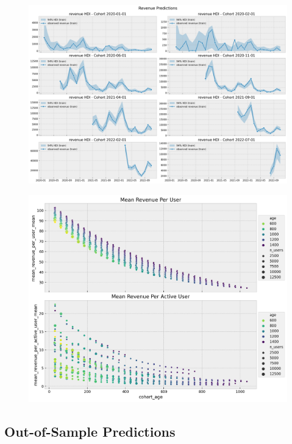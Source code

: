 \documentclass[11pt]{amsart}
\begin{document}
\begin{figure}
    \includegraphics[width=\textwidth]{images/revenue_retention_53_0.png}
\end{figure}

\begin{figure}
    \includegraphics[width=\textwidth]{images/revenue_retention_56_0.png}
\end{figure}

\subsection{Out-of-Sample Predictions}
\end{document}
